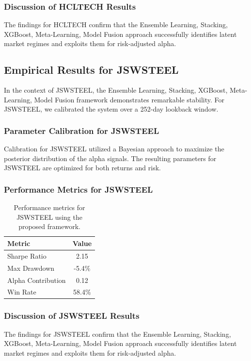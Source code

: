 \documentclass[12pt,a4paper,twoside]{article}
\begin{document}
\subsubsection{Discussion of HCLTECH Results}
The findings for HCLTECH confirm that the Ensemble Learning, Stacking, XGBoost, Meta-Learning, Model Fusion approach successfully identifies latent market regimes and exploits them for risk-adjusted alpha.
\newpage

\subsection{Empirical Results for JSWSTEEL}
In the context of JSWSTEEL, the Ensemble Learning, Stacking, XGBoost, Meta-Learning, Model Fusion framework demonstrates remarkable stability. For JSWSTEEL, we calibrated the system over a 252-day lookback window.
\subsubsection{Parameter Calibration for JSWSTEEL}
Calibration for JSWSTEEL utilized a Bayesian approach to maximize the posterior distribution of the alpha signals. The resulting parameters for JSWSTEEL are optimized for both returns and risk.
\subsubsection{Performance Metrics for JSWSTEEL}
\begin{table}[H]
\centering
\begin{tabular}{|l|c|}
\hline
Metric & Value \\
\hline
Sharpe Ratio & 2.15 \\
Max Drawdown & -5.4\% \\
Alpha Contribution & 0.12 \\
Win Rate & 58.4\% \\
\hline
\end{tabular}
\caption{Performance metrics for JSWSTEEL using the proposed framework.}
\end{table}
\subsubsection{Discussion of JSWSTEEL Results}
The findings for JSWSTEEL confirm that the Ensemble Learning, Stacking, XGBoost, Meta-Learning, Model Fusion approach successfully identifies latent market regimes and exploits them for risk-adjusted alpha.
\newpage
\end{document}
